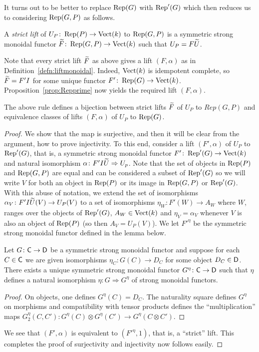 \documentclass[12pt]{amsart}
\begin{document}
It turns out to be better to replace $\operatorname{Rep}(G)$ with $\operatorname{Rep}'(G)$ which then reduces us to considering $\operatorname{Rep}(G,P)$ as follows. 
\begin{definition}  \label{defn:strictlift}
A {\em strict lift} of $U_P \colon \operatorname{Rep}(P) \to \textup{Vect}(k)$ to $\operatorname{Rep}(G,P)$ is a symmetric strong monoidal functor ${\widetilde{F}} \colon \operatorname{Rep}(G,P) \to \textup{Vect}(k)$ such that $U_P = F{\widetilde{U}}$. 
\end{definition}
Note that every strict lift ${\widetilde{F}}$ as above gives a lift $(F,\alpha)$ as in Definition~\ref{defn:liftmonoidal}. Indeed, $\textup{Vect}(k)$ is idempotent complete, so ${\widetilde{F}} = F' I$ for some unique functor $F' \colon \operatorname{Rep}(G) \to \textup{Vect}(k)$. Proposition~\ref{prop:Repprime} now yields the required lift $(F,\alpha)$. 
\begin{proposition}  \label{prop:cosetsasstrictlifts}
The above rule defines a bijection between strict lifts ${\widetilde{F}}$ of $U_P$ to $Rep(G,P)$ and equivalence classes of lifts $(F,\alpha)$ of $U_P$ to $\operatorname{Rep}(G)$. 
\end{proposition}
\begin{proof}
We show that the map is surjective, and then it will be clear from the argument, how to prove injectivity. To this end, consider a lift $(F',\alpha)$ of $U_P$ to $\operatorname{Rep}'(G)$, that is, a symmetric strong monoidal functor $F' \colon \operatorname{Rep}'(G) \to \textup{Vect}(k)$ and natural isomorphism $\alpha \colon F' I {\widetilde{U}} \Rightarrow U_p$. Note that the set of objects in $\operatorname{Rep}(P)$ and $\operatorname{Rep}(G,P)$ are equal and can be considered a subset of $\operatorname{Rep}'(G)$ so we will write $V$ for both an object in $\operatorname{Rep}(P)$ or its image in $\operatorname{Rep}(G,P)$ or $\operatorname{Rep}'(G)$. With this abuse of notation, we extend the set of isomorphisms $\alpha_V \colon F' I{\widetilde{U}} (V) \to U_P(V)$ to a set of isomorphisms $\eta_W \colon F'(W) \to A_W$ where $W$, ranges over the objects of $\operatorname{Rep}'(G)$, $A_W \in \textup{Vect}(k)$ and $\eta_V = \alpha_V$ whenever $V$ is also an object of $\operatorname{Rep}(P)$ (so then $A_V = U_P(V)$). We let $F'^{\eta}$ be the symmetric strong monoidal functor defined in the lemma below.
\begin{lemma}
Let $G \colon {\sf C} \to {\sf D}$ be a symmetric strong monoidal functor and suppose for each $C \in {\sf C}$ we are given isomorphisms  $\eta_C \colon G(C) \to D_C$ for some object $D_C \in {\sf D}$. There exists a unique symmetric strong monoidal functor $G^{\eta}\colon {\sf C} \to {\sf D}$ such that $\eta$ defines a natural isomorphism $\eta \colon G \Rightarrow G^{\eta}$ of strong monoidal functors. 
\end{lemma}
\begin{proof}
On objects, one defines $G^{\eta}(C) = D_C$. The naturality square defines $G^{\eta}$ on morphisms and compatibility with tensor products defines the ``multiplication'' maps $G^{\eta}_2(C,C') \colon G^{\eta}(C) \otimes G^{\eta}(C') \to G^{\eta}(C \otimes C')$. 
\end{proof}
We see that $(F',\alpha)$ is equivalent to $(F'^{\eta},1)$, that is, a ``strict'' lift. This completes the proof of surjectivity and injectivity now follows easily.
\end{proof}
\end{document}
